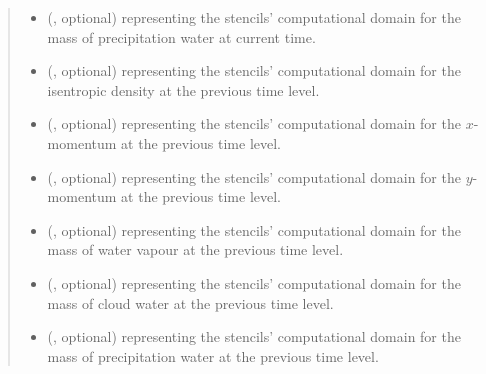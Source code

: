 \documentclass[letterpaper,10pt,english]{sphinxmanual}
\begin{document}
\begin{fulllineitems}
\begin{fulllineitems}
\begin{quote}
\begin{description}
\begin{itemize}
\item {} 
 (, optional) \textendash{}  representing the stencils’ computational domain for the mass of precipitation water
at current time.

\item {} 
 (, optional) \textendash{}  representing the stencils’ computational domain for the isentropic density
at the previous time level.

\item {} 
 (, optional) \textendash{}  representing the stencils’ computational domain for the \(x\)-momentum
at the previous time level.

\item {} 
 (, optional) \textendash{}  representing the stencils’ computational domain for the \(y\)-momentum
at the previous time level.

\item {} 
 (, optional) \textendash{}  representing the stencils’ computational domain for the mass of water vapour
at the previous time level.

\item {} 
 (, optional) \textendash{}  representing the stencils’ computational domain for the mass of cloud water
at the previous time level.

\item {} 
 (, optional) \textendash{}  representing the stencils’ computational domain for the mass of precipitation water
at the previous time level.


\end{itemize}
\end{description}
\end{quote}
\end{fulllineitems}
\end{fulllineitems}
\end{document}
